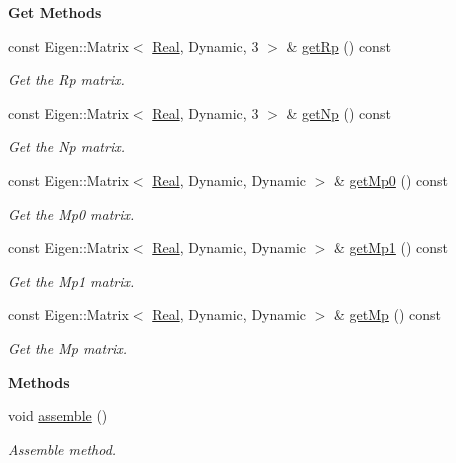 \begin{Indent}{\bf Get Methods}\par
\begin{DoxyCompactItemize}
\item 
const Eigen\+::\+Matrix$<$ \hyperlink{namespaceFVCode3D_a40c1f5588a248569d80aa5f867080e83}{Real}, Dynamic, 3 $>$ \& \hyperlink{classFVCode3D_1_1local__InnerProduct_a2f4a937da9b93f66e48632556b74b960}{get\+Rp} () const 
\begin{DoxyCompactList}\small\item\em Get the Rp matrix. \end{DoxyCompactList}\item 
const Eigen\+::\+Matrix$<$ \hyperlink{namespaceFVCode3D_a40c1f5588a248569d80aa5f867080e83}{Real}, Dynamic, 3 $>$ \& \hyperlink{classFVCode3D_1_1local__InnerProduct_acdfbfce6bfe6ef984ce82b7d0b15d1aa}{get\+Np} () const 
\begin{DoxyCompactList}\small\item\em Get the Np matrix. \end{DoxyCompactList}\item 
const Eigen\+::\+Matrix$<$ \hyperlink{namespaceFVCode3D_a40c1f5588a248569d80aa5f867080e83}{Real}, Dynamic, Dynamic $>$ \& \hyperlink{classFVCode3D_1_1local__InnerProduct_a2d1dce124daf8b3d2c5f0eae44687237}{get\+Mp0} () const 
\begin{DoxyCompactList}\small\item\em Get the Mp0 matrix. \end{DoxyCompactList}\item 
const Eigen\+::\+Matrix$<$ \hyperlink{namespaceFVCode3D_a40c1f5588a248569d80aa5f867080e83}{Real}, Dynamic, Dynamic $>$ \& \hyperlink{classFVCode3D_1_1local__InnerProduct_a65009b748d27225795e6daa3fa77fa45}{get\+Mp1} () const 
\begin{DoxyCompactList}\small\item\em Get the Mp1 matrix. \end{DoxyCompactList}\item 
const Eigen\+::\+Matrix$<$ \hyperlink{namespaceFVCode3D_a40c1f5588a248569d80aa5f867080e83}{Real}, Dynamic, Dynamic $>$ \& \hyperlink{classFVCode3D_1_1local__InnerProduct_a16d585bf2b6ed9f84bab4eff1027b671}{get\+Mp} () const 
\begin{DoxyCompactList}\small\item\em Get the Mp matrix. \end{DoxyCompactList}\end{DoxyCompactItemize}
\end{Indent}
\begin{Indent}{\bf Methods}\par
\begin{DoxyCompactItemize}
\item 
void \hyperlink{classFVCode3D_1_1local__InnerProduct_a5e5ade44aeb3e5982cdbc20e7721e07a}{assemble} ()
\begin{DoxyCompactList}\small\item\em Assemble method. \end{DoxyCompactList}\end{DoxyCompactItemize}
\end{Indent}
